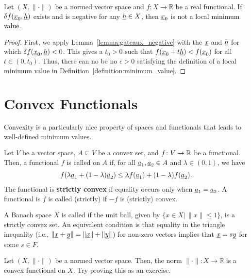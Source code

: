 \begin{theorem}
Let $(X,\|\cdot\|)$ be a normed vector space and $f\colon X \to \mathbb{R}$ be a real functional.
If $\delta f (\underline{x}_0,\underline{h})$ exists and is negative for any $\underline{h} \in X$, then $\underline{x}_0$ is not a local minimum value.
\end{theorem}
\begin{proof}
First, we apply Lemma~\ref{lemma:gateaux_negative} with the $\underline{x}$ and $\underline{h}$ for which $\delta f (\underline{x}_0,\underline{h})<0$.
This gives a $t_0 >0$ such that $f(\underline{x}_0+t \underline{h})<f(\underline{x}_0)$ for all $t\in (0,t_0)$.
Thus, there can no be no $\epsilon>0$ satisfying the definition of a local minimum value in  Definition~\ref{definition:minimum_value}.
\end{proof}

\section{Convex Functionals}

Convexity is a particularly nice property of spaces and functionals that leads to well-defined minimum values.




\begin{definition}
Let $V$ be a vector space, $A \subseteq V$ be a convex set, and $f \colon V \rightarrow \mathbb{R}$ be a functional.
Then, a functional $f$ is called  on $A$ if, for all $\underline{a}_1,\underline{a}_2 \in A$ and $\lambda\in(0,1)$, we have
\[ f( \lambda \underline{a}_1 + (1-\lambda) \underline{a}_2 ) \leq \lambda f( \underline{a}_1 ) + (1-\lambda) f ( \underline{a}_2 ). \]
The functional is \textbf{strictly convex} if equality occurs only when $\underline{a}_1 = \underline{a}_2$.
A functional is $f$ is called (strictly)  if $-f$ is (strictly) convex.
\end{definition}

\begin{definition}
A Banach space $X$ is called  if the unit ball,  given by $\{ x\in X | \, \| x \| \leq 1 \}$, is a strictly convex set.
An equivalent condition is that equality in the triangle inequality (i.e., $\| \underline{x} + \underline{y} \| = \| \underline{x} \| + \| \underline{y} \|$) for non-zero vectors implies that $ \underline{x} = s \underline{y} $ for some $s\in F$.
\end{definition}

\begin{example}
Let $(X,\|\cdot\|)$ be a normed vector space.
Then, the norm $\| \cdot \| \colon X \rightarrow \mathbb{R}$ is a convex functional on $X$.
Try proving this as an exercise.
\end{example}

